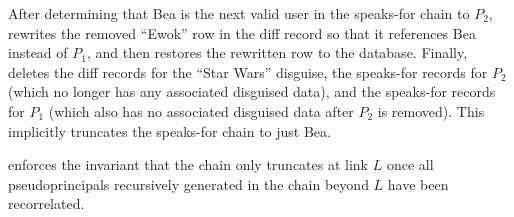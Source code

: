 \begin{enumerate}
%
After determining that Bea is the next valid user in the speaks-for chain to $P_2$,
\sys rewrites the removed ``Ewok'' row in the diff record so that it references Bea instead of $P_1$,
and then restores the rewritten row to the database.
%
Finally, \sys deletes the diff records for the ``Star Wars'' disguise, the
speaks-for records for $P_2$ (which no longer has any associated disguised
data), and the speaks-for records for $P_1$ (which also has no associated
disguised data after $P_2$ is removed).
%
This implicitly truncates the speaks-for chain to just Bea.
\end{enumerate}
%
\sys enforces the invariant that the chain only truncates at link
$L$ once all pseudoprincipals recursively generated in the chain beyond $L$ have
been recorrelated.
%


%

